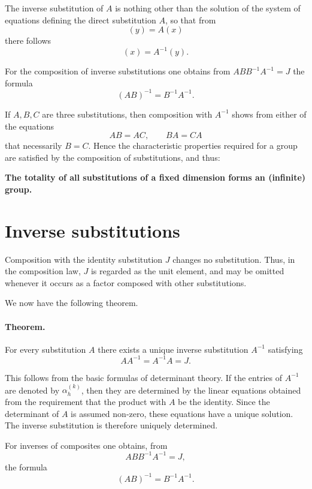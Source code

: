 \documentclass[11pt,a4paper]{book}
\begin{document}
The inverse substitution of \(A\) is nothing other than the solution of the system of equations defining the direct substitution \(A\), so that from
\[
(y)=A(x)
\]
there follows
\[
(x)=A^{-1}(y).
\tag{19}
\]

For the composition of inverse substitutions one obtains from \(ABB^{-1}A^{-1}=J\) the formula
\[
(AB)^{-1}=B^{-1}A^{-1}.
\tag{20}
\]

If \(A,B,C\) are three substitutions, then composition with \(A^{-1}\) shows from either of the equations
\[
AB=AC,\qquad BA=CA
\]
that necessarily \(B=C\). Hence the characteristic properties required for a group are satisfied by the composition of substitutions, and thus:

\medskip
\noindent
\textbf{The totality of all substitutions of a fixed dimension forms an (infinite) group.}

\section*{Inverse substitutions}
Composition with the identity substitution $J$ changes no substitution.  Thus, in the composition law, $J$ is regarded as the unit element, and may be omitted whenever it occurs as a factor composed with other substitutions.

We now have the following theorem.

\paragraph{Theorem.} For every substitution $A$ there exists a unique inverse substitution $A^{-1}$ satisfying
\begin{equation}\label{eq:weber8-inverse}
AA^{-1}=A^{-1}A=J.
\end{equation}

This follows from the basic formulas of determinant theory.  If the entries of $A^{-1}$ are denoted by $\alpha_h^{(k)}$, then they are determined by the linear equations obtained from the requirement that the product with $A$ be the identity.  Since the determinant of $A$ is assumed non-zero, these equations have a unique solution.  The inverse substitution is therefore uniquely determined.

For inverses of composites one obtains, from
\[
ABB^{-1}A^{-1}=J,
\]
the formula
\begin{equation}\label{eq:weber8-composite-inverse}
(AB)^{-1}=B^{-1}A^{-1}.
\end{equation}
\end{document}
